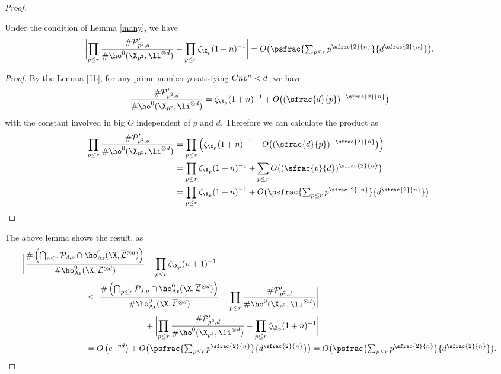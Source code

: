 \begin{proof}
\begin{lem}\label{manymany}
Under the condition of Lemma \ref{many}, we have
\[
\biggl| \prod_{p\leq r} \frac{\#\mathcal{P}'_{p^2,d}}{\#\ho^0(\X_{p^2}, \li^{\otimes d})} - \prod_{p\leq r} \zeta_{\X_p}(1+n)^{-1} \biggr| =O\bigl(\psfrac{\textstyle\sum_{p\leq r}p^{\sfrac{2}{n}}}{d^{\sfrac{2}{n}}} \bigr).
\]
\end{lem}
\begin{proof}
By the Lemma \ref{fib}, for any prime number $p$ satisfying $Cnp^n<\nobreak d$, we have
\[
\frac{\#\mathcal{P}'_{p^2,d}}{\#\ho^0(\X_{p^2}, \li^{\otimes d})}=\zeta_{\X_p}(1+n)^{-1} + O\bigl((\sfrac{d}{p})^{-\sfrac{2}{n}} \bigr)
\]
with the constant involved in big $O$ independent of $p$ and $d$. Therefore we can calculate the product as
\begin{align*}
\prod_{p\leq r} \frac{\#\mathcal{P}'_{p^2,d}}{\#\ho^0(\X_{p^2}, \li^{\otimes d})} &= \prod_{p\leq r} \left(\zeta_{\X_p}(1+n)^{-1} + O\bigl((\sfrac{d}{p})^{-\sfrac{2}{n}} \bigr) \right) \\
&= \prod_{p\leq r} \zeta_{\X_p}(1+n)^{-1} +\sum_{p\leq r} O\bigl((\sfrac{p}{d})^{\sfrac{2}{n}} \bigr) \\
&= \prod_{p\leq r} \zeta_{\X_p}(1+n)^{-1} + O\bigl(\psfrac{\textstyle\sum_{p\leq r} p^{\sfrac{2}{n}}}{d^{\sfrac{2}{n}}} \bigr).\qedhere
\end{align*}
\end{proof}
The above lemma shows the result, as
\begin{align*}
\biggl| \frac{\#\left(\bigcap_{p\leq r}\mathcal{P}_{d,p}\cap \ho^0_{\mathrm{Ar}}(\X, \overline{\mathcal{L}}{}^{\otimes d})\right)}{\#\ho^0_{\mathrm{Ar}}(\X, \overline{\mathcal{L}}{}^{\otimes d})} &-\prod_{p\leq r}\zeta_{\X_p}(n+1)^{-1} \biggr| \\
&\hspace*{-2.5cm}\leq \biggl| \frac{\#\left(\bigcap_{p\leq r}\mathcal{P}_{d,p}\cap \ho^0_{\mathrm{Ar}}(\X, \overline{\mathcal{L}}{}^{\otimes d})\right)}{\#\ho^0_{\mathrm{Ar}}(\X, \overline{\mathcal{L}}{}^{\otimes d})} -\prod_{p\leq r} \frac{\#\mathcal{P}'_{p^2,d}}{\#\ho^0(\X_{p^2}, \li^{\otimes d})} \biggr| \\
& +\biggl| \prod_{p\leq r} \frac{\#\mathcal{P}'_{p^2,d}}{\#\ho^0(\X_{p^2}, \li^{\otimes d})} - \prod_{p\leq r} \zeta_{\X_p}(1+n)^{-1} \biggr| \\
&\hspace*{-2.5cm}=O\left(e^{-\eta d} \right)+O\bigl(\psfrac{\textstyle\sum_{p\leq r} p^{\sfrac{2}{n}}}{d^{\sfrac{2}{n}}} \bigr)=O\bigl(\psfrac{\textstyle\sum_{p\leq r} p^{\sfrac{2}{n}}}{d^{\sfrac{2}{n}}} \bigr).\qedhere
\end{align*}
\end{proof}


